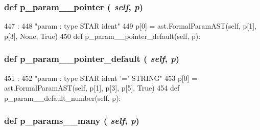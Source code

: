 \begin{DoxyVerb}
{\subsubsection[{p\_\-param\_\-\_\-pointer}]{\setlength{\rightskip}{0pt plus 5cm}def p\_\-param\_\-\_\-pointer ( {\em self}, \/   {\em p})}}
\label{classslicc_1_1parser_1_1SLICC_a2d8f55c927464513c7500638efab833c}



\begin{DoxyCode}
447                                  :
448         "param : type STAR ident"
449         p[0] = ast.FormalParamAST(self, p[1], p[3], None, True)
450 
    def p_param__pointer_default(self, p):
\end{DoxyCode}
\hypertarget{classslicc_1_1parser_1_1SLICC_a35154ea522cbd0357d23d5ea0de7f9b0}{
\subsubsection[{p\_\-param\_\-\_\-pointer\_\-default}]{\setlength{\rightskip}{0pt plus 5cm}def p\_\-param\_\-\_\-pointer\_\-default ( {\em self}, \/   {\em p})}}
\label{classslicc_1_1parser_1_1SLICC_a35154ea522cbd0357d23d5ea0de7f9b0}



\begin{DoxyCode}
451                                          :
452         "param : type STAR ident '=' STRING"
453         p[0] = ast.FormalParamAST(self, p[1], p[3], p[5], True)
454 
    def p_param__default_number(self, p):
\end{DoxyCode}
\hypertarget{classslicc_1_1parser_1_1SLICC_ad817f3c7b9149f8b7b92dd07f3ce758a}{
\subsubsection[{p\_\-params\_\-\_\-many}]{\setlength{\rightskip}{0pt plus 5cm}def p\_\-params\_\-\_\-many ( {\em self}, \/   {\em p})}}
\label{classslicc_1_1parser_1_1SLICC_ad817f3c7b9149f8b7b92dd07f3ce758a}




\end{DoxyVerb}
